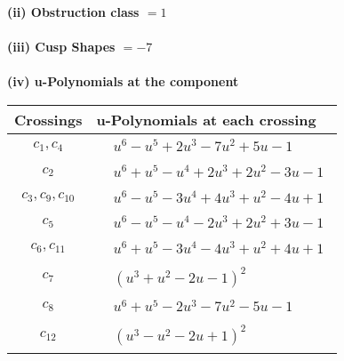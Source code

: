 \documentclass[1p]{elsarticle_modified}
\theoremstyle{definition}
\begin{document}
\flushleft \textbf{(ii) Obstruction class $= 1$}\\~\\
\flushleft \textbf{(iii) Cusp Shapes $= -7$}\\~\\
\newpage\renewcommand{\arraystretch}{1}
\flushleft \textbf{(iv) u-Polynomials at the component}\newline \\
\begin{tabular}{m{50pt}|m{274pt}}
Crossings & \hspace{64pt}u-Polynomials at each crossing \\
\hline $$\begin{aligned}c_{1},c_{4}\end{aligned}$$&$\begin{aligned}
&u^6- u^5+2 u^3-7 u^2+5 u-1
\end{aligned}$\\
\hline $$\begin{aligned}c_{2}\end{aligned}$$&$\begin{aligned}
&u^6+u^5- u^4+2 u^3+2 u^2-3 u-1
\end{aligned}$\\
\hline $$\begin{aligned}c_{3},c_{9},c_{10}\end{aligned}$$&$\begin{aligned}
&u^6- u^5-3 u^4+4 u^3+u^2-4 u+1
\end{aligned}$\\
\hline $$\begin{aligned}c_{5}\end{aligned}$$&$\begin{aligned}
&u^6- u^5- u^4-2 u^3+2 u^2+3 u-1
\end{aligned}$\\
\hline $$\begin{aligned}c_{6},c_{11}\end{aligned}$$&$\begin{aligned}
&u^6+u^5-3 u^4-4 u^3+u^2+4 u+1
\end{aligned}$\\
\hline $$\begin{aligned}c_{7}\end{aligned}$$&$\begin{aligned}
&(u^3+u^2-2 u-1)^2
\end{aligned}$\\
\hline $$\begin{aligned}c_{8}\end{aligned}$$&$\begin{aligned}
&u^6+u^5-2 u^3-7 u^2-5 u-1
\end{aligned}$\\
\hline $$\begin{aligned}c_{12}\end{aligned}$$&$\begin{aligned}
&(u^3- u^2-2 u+1)^2
\end{aligned}$\\
\hline
\end{tabular}\\~\\
\end{document}

